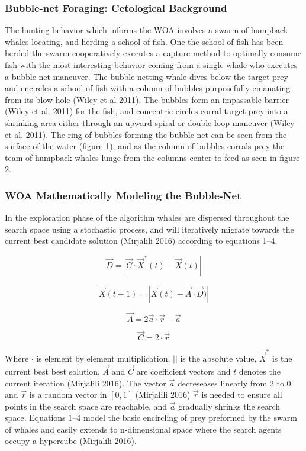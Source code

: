 \documentclass[11pt]{article}
\begin{document}
\subsubsection*{Bubble-net Foraging: Cetological Background}
The hunting behavior which informs the WOA involves a swarm of humpback whales locating, and herding a school of fish.
One the school of fish has been herded the swarm cooperatively executes a capture method to optimally consume fish with the most interesting behavior coming from a single whale who executes a bubble-net maneuver.
The bubble-netting whale dives below the target prey and encircles a school of fish with a column of bubbles purposefully emanating from its blow hole (Wiley et al 2011).
The bubbles form an impassable barrier (Wiley et al. 2011) for the fish, and concentric circles corral target prey into a shrinking area either through an upward-spiral or double loop maneuver (Wiley et al. 2011).
The ring of bubbles forming the bubble-net can be seen from the surface of the water (figure 1), and as the column of bubbles corrals prey the team of humpback whales lunge from the columns center to feed as seen in figure 2.

\subsubsection*{WOA Mathematically Modeling the Bubble-Net}
In the exploration phase of the algorithm whales are dispersed throughout the search space using a stochastic process, and will iteratively migrate towards the current best candidate solution (Mirjalili 2016) according to equations 1--4.

\begin{equation}
	\vec{D} = |\vec{C}\cdot\vec{X}^*(t) - \vec{X}(t)|
\end{equation}

\begin{equation}
	\vec{X}(t + 1) = |\vec{X}(t) - \vec{A}\cdot\vec{D})|
\end{equation}

\begin{equation}
	\vec{A} = 2\vec{a}\cdot\vec{r}-\vec{a}
\end{equation}

\begin{equation}
	\vec{C} = 2\cdot\vec{r}
\end{equation}

Where $\cdot$ is element by element multiplication, $| |$ is the absolute value, $\vec{X}^*$ is the current best best solution, $\vec{A}$ and $\vec{C}$ are coefficient vectors and $t$ denotes the current iteration (Mirjalili 2016).
The vector $\vec{a}$ decreseases linearly from $2$ to $0$ and $\vec{r}$ is a random vector in $[0,1]$ (Mirjalili 2016) $\vec{r}$ is needed to ensure all points in the search space are reachable, and $\vec{a}$ gradually shrinks the search space.
Equations 1--4 model the basic encircling of prey preformed by the swarm of whales and easily extends to n-dimensional space where the search agents occupy a hypercube (Mirjalili 2016).
\end{document}
